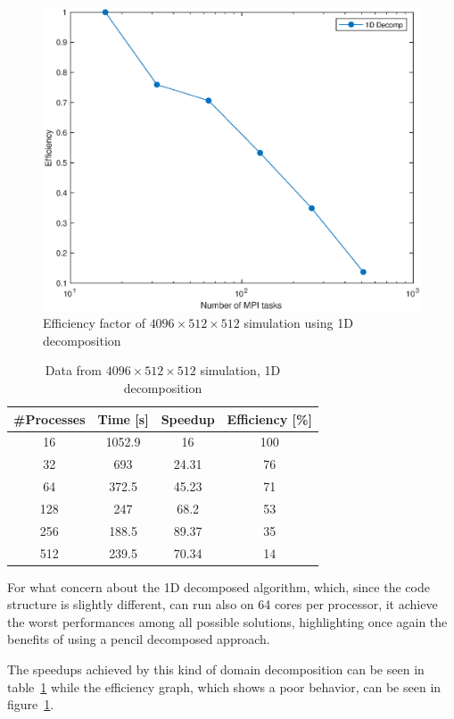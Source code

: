\begin{figure}
\begin{center}
\includegraphics[scale=0.55]{grafici/20483}
\caption{Efficiency factor of $4096\times512 \times512$ simulation using 1D decomposition}
\label{20483}
\end{center}
\end{figure}

\begin{table}
\caption{Data from $4096\times 512\times 512$ simulation, 1D decomposition}
\begin{center}
\begin{tabular}{c c c c}
\toprule
\textbf{\#Processes} & \textbf{Time [s]} & \textbf{Speedup} & \textbf{Efficiency [\%]}\\
\midrule
16 & 1052.9 & 16 & 100\\
32 & 693 & 24.31 & 76\\
64 & 372.5 & 45.23 & 71\\
128 & 247 & 68.2 & 53\\
256 & 188.5 & 89.37 & 35\\
512 & 239.5 & 70.34 & 14\\
\bottomrule
\end{tabular}
\end{center}
\label{2048:data:1}
\end{table}

\par
For what concern about the 1D decomposed algorithm, which, since the code structure is slightly different, can run also on 64 cores per processor, it achieve the worst performances among all possible solutions, highlighting once again the benefits of using a pencil decomposed approach. \par
The speedups achieved by this kind of domain decomposition can be seen in table~\ref{2048:data:1} while the efficiency graph, which shows a poor behavior, can be seen in figure~\ref{20483}. \\
\par



